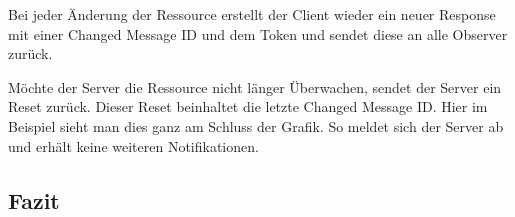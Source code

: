 Bei jeder Änderung der Ressource erstellt der Client wieder ein neuer Response mit einer Changed Message ID und dem Token und sendet diese an alle Observer zurück.

Möchte der Server die Ressource nicht länger Überwachen, sendet der Server ein Reset zurück. Dieser Reset beinhaltet die letzte Changed Message ID. Hier im Beispiel sieht man dies ganz am Schluss der Grafik. So meldet sich der Server ab und erhält keine weiteren Notifikationen.

\subsection{Fazit}